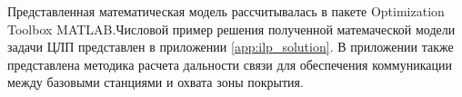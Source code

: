 Представленная математическая модель рассчитывалась в пакете Optimization Toolbox MATLAB.Числовой пример решения полученной матемаческой модели задачи ЦЛП представлен в приложении \cref{app:ilp_solution}. В приложении также представлена методика расчета дальности связи для обеспечения коммуникации между базовыми станциями и охвата зоны покрытия.







